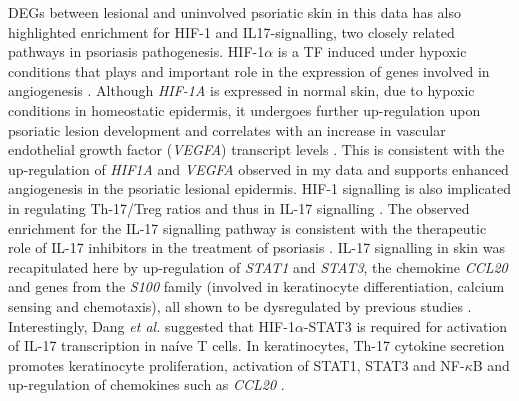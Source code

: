 DEGs between lesional and uninvolved psoriatic skin in this data has also highlighted enrichment for HIF-1 and IL17-signalling, two closely related pathways in psoriasis pathogenesis. HIF-1$\alpha$ is a TF induced under hypoxic conditions that plays and important role in the expression of genes involved in angiogenesis \parencite{Forsythe1996}. Although \textit{HIF-1A} is expressed in normal skin, due to hypoxic conditions in homeostatic epidermis, it undergoes further up-regulation upon psoriatic lesion development and correlates with an increase in vascular endothelial growth factor (\textit{VEGFA}) transcript levels \parencite{Rosenberger2007}. This is consistent with the up-regulation of \textit{HIF1A} and \textit{VEGFA} observed in my data and supports enhanced angiogenesis in the psoriatic lesional epidermis. HIF-1 signalling is also implicated in regulating Th-17/Treg ratios and thus in IL-17 signalling \parencite{Dang2011,Shi2011}. The observed enrichment for the IL-17 signalling pathway is consistent with the therapeutic role of IL-17 inhibitors in the treatment of psoriasis \parencite{Mahil2016,Coates2016a}. IL-17 signalling in skin was recapitulated here by up-regulation of \textit{STAT1} and \textit{STAT3}, the chemokine \textit{CCL20} and genes from the \textit{S100} family (involved in keratinocyte differentiation, calcium sensing and chemotaxis), all shown to be dysregulated by previous studies \parencite{Tsoi2015,Tervaniemi2016}. %
Interestingly, Dang \textit{et al.}  suggested that HIF-1$\alpha$-STAT3 is required for activation of IL-17 transcription in na\'{i}ve T cells. In keratinocytes, Th-17 cytokine secretion promotes keratinocyte proliferation, activation of STAT1, STAT3 and NF-$\kappa$B and up-regulation of chemokines such as \textit{CCL20}  \parencite{Carrier2011,Harper2009}. %

